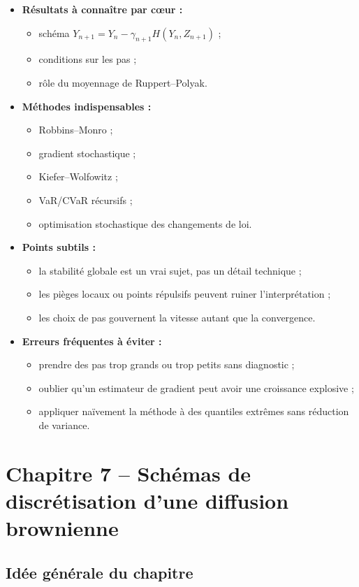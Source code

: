 \documentclass[11pt,a4paper]{article}
\begin{document}
\begin{itemize}
  \item \textbf{Résultats à connaître par cœur :}
  \begin{itemize}
    \item schéma $Y_{n+1}=Y_n-\gamma_{n+1}H(Y_n,Z_{n+1})$ ;
    \item conditions sur les pas ;
    \item rôle du moyennage de Ruppert--Polyak.
  \end{itemize}
  \item \textbf{Méthodes indispensables :}
  \begin{itemize}
    \item Robbins--Monro ;
    \item gradient stochastique ;
    \item Kiefer--Wolfowitz ;
    \item VaR/CVaR récursifs ;
    \item optimisation stochastique des changements de loi.
  \end{itemize}
  \item \textbf{Points subtils :}
  \begin{itemize}
    \item la stabilité globale est un vrai sujet, pas un détail technique ;
    \item les pièges locaux ou points répulsifs peuvent ruiner l'interprétation ;
    \item les choix de pas gouvernent la vitesse autant que la convergence.
  \end{itemize}
  \item \textbf{Erreurs fréquentes à éviter :}
  \begin{itemize}
    \item prendre des pas trop grands ou trop petits sans diagnostic ;
    \item oublier qu'un estimateur de gradient peut avoir une croissance explosive ;
    \item appliquer naïvement la méthode à des quantiles extrêmes sans réduction de variance.
  \end{itemize}
\end{itemize}

\section{Chapitre 7 -- Schémas de discrétisation d'une diffusion brownienne}

\subsection{Idée générale du chapitre}
\end{document}
